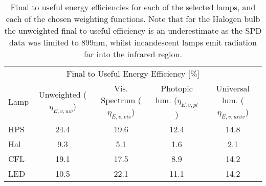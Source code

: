 

\begin{table}
\centering %
\caption{Final to useful energy efficiencies for each of the selected lamps, and each of the chosen weighting functions. Note that for the Halogen bulb the unweighted final to useful efficiency is an underestimate as the SPD data was limited to 899nm, whilst incandescent lamps emit radiation far into the infrared region. }
\begin{tabular}{l c c c c}
\hline
\multicolumn{5}{c}{Final to Useful Energy Efficiency [\%]} \\
\cline{2-5}
  Lamp 
      & Unweighted ($\eta_{E,v,uw}$)
      & Vis. Spectrum ($\eta_{E,v,vis}$)
      & Photopic lum. ($\eta_{E,v,pl}$)
      & Universal lum. ($\eta_{E,v,univ}$)  \\
\hline
  HPS & 24.4 & 19.6 & 12.4 & 14.8     \\
  Hal & 9.3 & 5.1 & 1.6 & 2.1    \\
  CFL & 19.1 & 17.5 & 8.9 & 14.2     \\
  LED & 10.5 & 22.1 & 11.1 & 14.2     \\
\hline
\end{tabular}
\label{tab:results_etas}
\end{table}